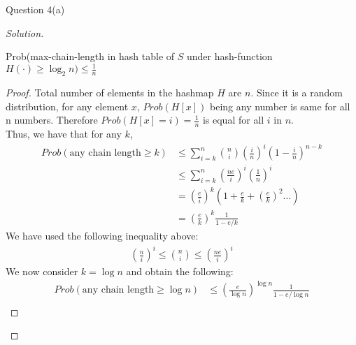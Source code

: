 \begin{solution}{Question 4(a)}\label{ques:41}
    \begin{question}
        
    \end{question}
    \tcblower{}
    \begin{proof}[Solution]
        \begin{claim}\label{claim:q1}
        Prob(max-chain-length in hash table of $S$ under hash-function $H(\cdot)\geq \log_2 n) \leq \frac{1}{n}$
        \end{claim}
        \begin{proof}
        Total number of elements in the hashmap $H$ are $n$. Since it is a random distribution, for any element $x$, $Prob(H[x])$ being any number is same for all n numbers. Therefore $Prob(H[x]=i)=\frac{1}{n}$ is equal for all $i$ in $n$.\\
        Thus, we have that for any $k$,
        \begin{equation}
            \begin{split}
                Prob(\text{any chain length} \geq k) &\leq\sum_{i=k}^n \binom{n}{i}\left(\frac{i}{n}\right)^i \left(1 - \frac{i}{n}\right)^{n-k}\\
                                                 &\leq\sum_{i=k}^n \left(\frac{ne}{i}\right)^i\left(\frac{1}{n}\right)^i\\
                                                 &= \left(\frac{e}{i}\right)^k\left(1 + \frac{e}{k} + \left(\frac{e}{k}\right)^2 \ldots \right)\\
                                                 &= \left(\frac{e}{k}\right)^k \frac{1}{1-e/k}
            \end{split}
        \end{equation}
        We have used the following inequality above:
        \begin{equation}
            \begin{split}
                \left( \frac{n}{i} \right)^i \leq \binom n i \leq \left( \frac{ne}{i} \right)^i            \end{split}
        \end{equation}
        We now consider $k=\log{n}$ and obtain the following:
        \begin{equation}\label{eq:prob}
            \begin{split}
                Prob(\text{any chain length} \geq \log{n}) &\leq \left(\frac{e}{\log{n}}\right)^{\log{n}} \frac{1}{1-e/\log{n}}\\

\end{split}
\end{equation}
\end{proof}
\end{proof}
\end{solution}
